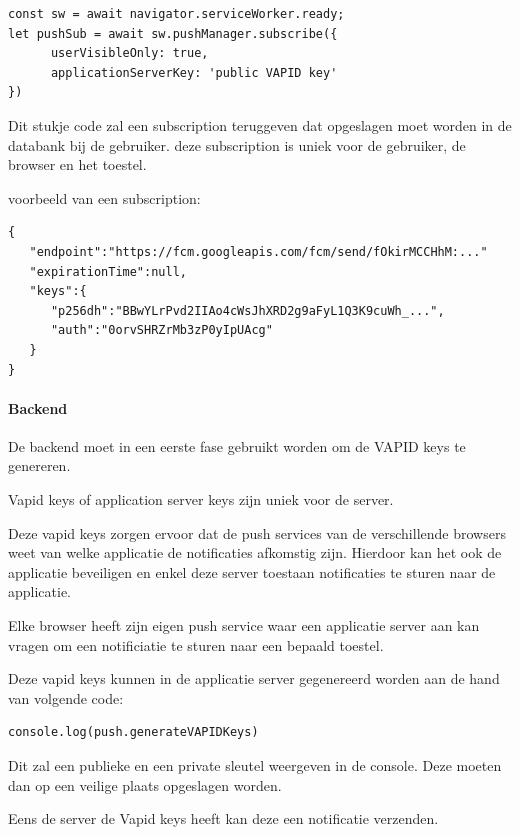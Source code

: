 \begin{lstlisting}
const sw = await navigator.serviceWorker.ready;
let pushSub = await sw.pushManager.subscribe({
      userVisibleOnly: true,
      applicationServerKey: 'public VAPID key'
})
\end{lstlisting}

			Dit stukje code zal een subscription teruggeven dat opgeslagen moet worden in de databank bij de gebruiker. deze subscription is uniek voor de gebruiker, de browser en het toestel.
			\autocite{Gaunt2019a}
			
			voorbeeld van een subscription:
	
\begin{lstlisting}
{
   "endpoint":"https://fcm.googleapis.com/fcm/send/fOkirMCCHhM:..."
   "expirationTime":null,
   "keys":{
      "p256dh":"BBwYLrPvd2IIAo4cWsJhXRD2g9aFyL1Q3K9cuWh_...",
      "auth":"0orvSHRZrMb3zP0yIpUAcg"
   }
}
\end{lstlisting}


		\paragraph{Backend}
			De backend moet in een eerste fase gebruikt worden om de VAPID keys te genereren.
			
			Vapid keys of application server keys zijn uniek voor de server.
			
			Deze vapid keys zorgen ervoor dat de push services van de verschillende browsers weet van welke applicatie de notificaties afkomstig zijn. Hierdoor kan het ook de applicatie beveiligen en enkel deze server toestaan notificaties te sturen naar de applicatie.
			
			Elke browser heeft zijn eigen push service waar een applicatie server aan kan vragen om een notificiatie te sturen naar een bepaald toestel.
			\autocite{Gaunt2020}
			
			Deze vapid keys kunnen in de applicatie server gegenereerd worden aan de hand van volgende code:
			
\begin{lstlisting}
console.log(push.generateVAPIDKeys)
\end{lstlisting}

			Dit zal een publieke en een private sleutel weergeven in de console. Deze moeten dan op een veilige plaats opgeslagen worden.
			
			Eens de server de Vapid keys heeft kan deze een notificatie verzenden.
			
